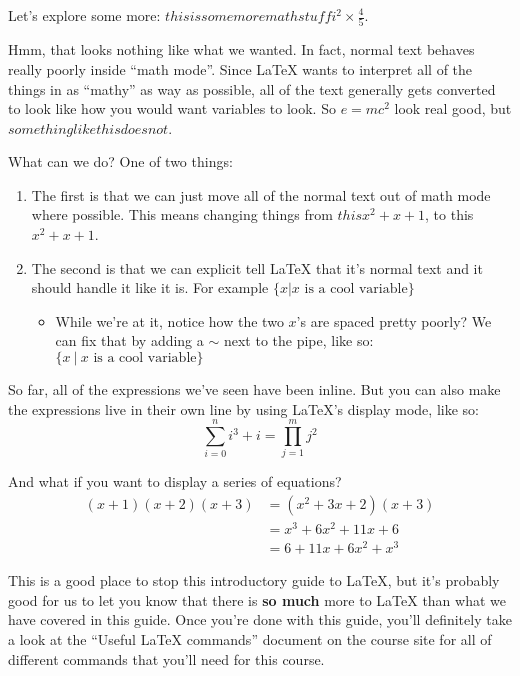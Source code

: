 \documentclass{article}
\begin{document}
Let's explore some more: $this is some more math stuff i^2 \times \frac{4}{5}$.

Hmm, that looks nothing like what we wanted. In fact, normal text behaves really
poorly inside ``math mode''. Since LaTeX wants to interpret all of the things
in as ``mathy'' as way as possible, all of the text generally gets converted to
look like how you would want variables to look. So $e=mc^2$ look real good, but
$something like this does not$.

What can we do? One of two things:
\begin{enumerate}
  \item The first is that we can just move all of the normal text out of math
  mode where possible. This means changing things from $this x^2+x+1$, to this
  $x^2+x+1$.
  \item The second is that we can explicit tell \LaTeX{} \@ that it's normal text
  and it should handle it like it is. For example
  $\{x | x \text{ is a cool variable} \}$
  \begin{itemize}
    \item While we're at it, notice how the two $x$'s are spaced pretty poorly?
    We can fix that by adding a $\sim$ next to the pipe, like so:
    $\{x ~|~ x \text{ is a cool variable} \}$
  \end{itemize}
\end{enumerate}

So far, all of the expressions we've seen have been inline. But you can also
make the expressions live in their own line by using \LaTeX's display mode,
like so:
\[\sum_{i=0}^n i^3 + i = \prod_{j=1}^m j^2\]

And what if you want to display a series of equations?
\begin{align*}
  (x+1)(x+2)(x+3) &= (x^2+3x+2)(x+3)\\
  &= x^3+6x^2+11x+6\\
  &= 6 + 11x + 6x^2 + x^3
\end{align*}

This is a good place to stop this introductory guide to \LaTeX, but it's probably
good for us to let you know that there is \textbf{so much} more to \LaTeX{} \@ than
what we have covered in this guide. Once you're done with this guide, you'll
definitely take a look at the ``Useful \LaTeX{} \@ commands'' document on the course
site for all of different commands that you'll need for this course.
\end{document}
